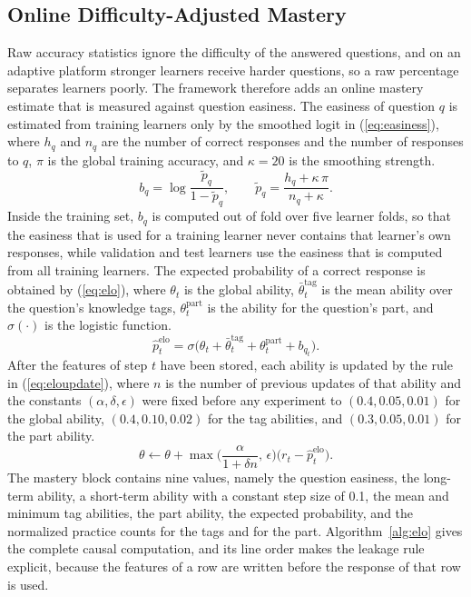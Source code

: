 \documentclass[11pt]{article}
\begin{document}
\subsection{Online Difficulty-Adjusted Mastery}

Raw accuracy statistics ignore the difficulty of the answered questions, and on an adaptive platform stronger learners receive harder questions, so a raw percentage separates learners poorly. The framework therefore adds an online mastery estimate that is measured against question easiness. The easiness of question $q$ is estimated from training learners only by the smoothed logit in (\ref{eq:easiness}), where $h_q$ and $n_q$ are the number of correct responses and the number of responses to $q$, $\pi$ is the global training accuracy, and $\kappa = 20$ is the smoothing strength.
\begin{equation}\label{eq:easiness}
b_q = \log\frac{\tilde{p}_q}{1-\tilde{p}_q}, \qquad \tilde{p}_q = \frac{h_q + \kappa\,\pi}{n_q + \kappa}.
\end{equation}
Inside the training set, $b_q$ is computed out of fold over five learner folds, so that the easiness that is used for a training learner never contains that learner's own responses, while validation and test learners use the easiness that is computed from all training learners. The expected probability of a correct response is obtained by (\ref{eq:elo}), where $\theta_t$ is the global ability, $\bar{\theta}^{\text{tag}}_t$ is the mean ability over the question's knowledge tags, $\theta^{\text{part}}_t$ is the ability for the question's part, and $\sigma(\cdot)$ is the logistic function.
\begin{equation}\label{eq:elo}
\hat{p}^{\text{elo}}_t = \sigma\big(\theta_t + \bar{\theta}^{\text{tag}}_t + \theta^{\text{part}}_t + b_{q_t}\big).
\end{equation}
After the features of step $t$ have been stored, each ability is updated by the rule in (\ref{eq:eloupdate}), where $n$ is the number of previous updates of that ability and the constants $(\alpha,\delta,\epsilon)$ were fixed before any experiment to $(0.4, 0.05, 0.01)$ for the global ability, $(0.4, 0.10, 0.02)$ for the tag abilities, and $(0.3, 0.05, 0.01)$ for the part ability.
\begin{equation}\label{eq:eloupdate}
\theta \leftarrow \theta + \max\!\Big(\frac{\alpha}{1+\delta n},\, \epsilon\Big)\big(r_t - \hat{p}^{\text{elo}}_t\big).
\end{equation}
The mastery block contains nine values, namely the question easiness, the long-term ability, a short-term ability with a constant step size of 0.1, the mean and minimum tag abilities, the part ability, the expected probability, and the normalized practice counts for the tags and for the part. Algorithm~\ref{alg:elo} gives the complete causal computation, and its line order makes the leakage rule explicit, because the features of a row are written before the response of that row is used.
\end{document}
